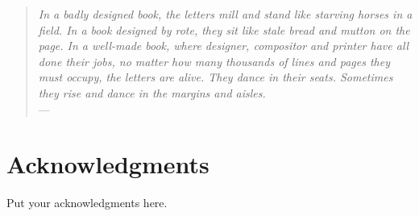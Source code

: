 \cleardoublepage

\begin{quote}{\slshape    
    In a badly designed book, the letters mill 
    and stand like starving horses in a field.
    In a book designed by rote, they sit 
    like stale bread and mutton on the page. 
    In a well-made book, where designer, compositor
    and printer have all done their jobs, 
    no matter how many thousands of lines and pages 
    they must occupy, the letters are alive. 
    They dance in their seats. 
    Sometimes they rise and dance in the margins and aisles. } \\ \medskip
    ---  \citep{Bringhurst2008}
\end{quote}



\bigskip

\begingroup
\let\clearpage\relax
\let\cleardoublepage\relax
\let\cleardoublepage\relax
\chapter*{Acknowledgments}
Put your acknowledgments here.




\endgroup



